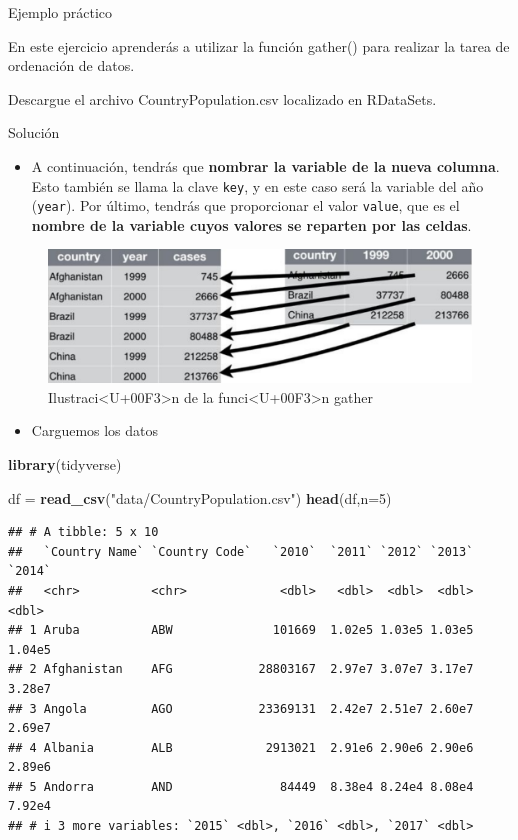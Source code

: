 \documentclass[
]{book}
\newenvironment{Shaded}{\begin{snugshade}}{\end{snugshade}}
\newcommand{\AttributeTok}[1]{\textcolor[rgb]{0.13,0.29,0.53}{#1}}
\newcommand{\DecValTok}[1]{\textcolor[rgb]{0.00,0.00,0.81}{#1}}
\newcommand{\FunctionTok}[1]{\textcolor[rgb]{0.13,0.29,0.53}{\textbf{#1}}}
\newcommand{\NormalTok}[1]{#1}
\newcommand{\OtherTok}[1]{\textcolor[rgb]{0.56,0.35,0.01}{#1}}
\newcommand{\StringTok}[1]{\textcolor[rgb]{0.31,0.60,0.02}{#1}}
\providecommand{\tightlist}{%
  \setlength{\itemsep}{0pt}\setlength{\parskip}{0pt}}
\begin{document}
{} Ejemplo práctico

En este ejercicio aprenderás a utilizar la función gather() para realizar la tarea de ordenación de datos.

Descargue el archivo CountryPopulation.csv localizado en
RDataSets.

Solución

\begin{itemize}
\tightlist
\item
  A continuación, tendrás que \textbf{nombrar la variable de la nueva columna}. Esto también se llama la clave \texttt{key}, y en este caso será la variable del año (\texttt{year}). Por último, tendrás que proporcionar el valor \texttt{value}, que es el \textbf{nombre de la variable cuyos valores se reparten por las celdas}.
\end{itemize}

\begin{figure}

{\centering \includegraphics[width=1\linewidth]{images/figura4} 

}

\caption{Ilustraci<U+00F3>n de la funci<U+00F3>n gather}\label{fig:figura3}
\end{figure}

\begin{itemize}
\tightlist
\item
  Carguemos los datos
\end{itemize}

\begin{Shaded}
\begin{Highlighting}[]
\FunctionTok{library}\NormalTok{(tidyverse)}

\NormalTok{df }\OtherTok{=} \FunctionTok{read\_csv}\NormalTok{(}\StringTok{"data/CountryPopulation.csv"}\NormalTok{)}
\FunctionTok{head}\NormalTok{(df,}\AttributeTok{n=}\DecValTok{5}\NormalTok{)}
\end{Highlighting}
\end{Shaded}

\begin{verbatim}
## # A tibble: 5 x 10
##   `Country Name` `Country Code`   `2010`  `2011` `2012` `2013` `2014`
##   <chr>          <chr>             <dbl>   <dbl>  <dbl>  <dbl>  <dbl>
## 1 Aruba          ABW              101669  1.02e5 1.03e5 1.03e5 1.04e5
## 2 Afghanistan    AFG            28803167  2.97e7 3.07e7 3.17e7 3.28e7
## 3 Angola         AGO            23369131  2.42e7 2.51e7 2.60e7 2.69e7
## 4 Albania        ALB             2913021  2.91e6 2.90e6 2.90e6 2.89e6
## 5 Andorra        AND               84449  8.38e4 8.24e4 8.08e4 7.92e4
## # i 3 more variables: `2015` <dbl>, `2016` <dbl>, `2017` <dbl>
\end{verbatim}
\end{document}
